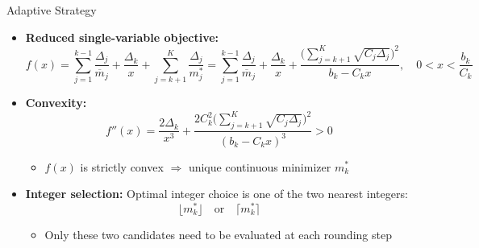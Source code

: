\documentclass{beamer}
\begin{document}
\begin{frame}{Adaptive Strategy}

{\fontsize{9}{9}\selectfont
\begin{itemize}[leftmargin=5pt]
\item \textcolor{myblue3}{\bf Reduced single-variable objective:}
\[
f(x)
= \sum_{j=1}^{k-1}\frac{\Delta_j}{\overline m_j}
+ \frac{\Delta_k}{x}
+ \sum_{j=k+1}^{K}\frac{\Delta_j}{m_j^*}
= \sum_{j=1}^{k-1}\frac{\Delta_j}{\overline m_j}
+ \frac{\Delta_k}{x}
+ \frac{\Big(\sum_{j=k+1}^{K} \sqrt{C_j \Delta_j}\Big)^2}{b_k - C_k x},
\quad 0 < x < \frac{b_k}{C_k}
\]

\item \textcolor{myblue3}{\bf Convexity:} 
\[
f''(x)
= \frac{2\Delta_k}{x^3} + \frac{2 C_k^2 \Big(\sum_{j=k+1}^K \sqrt{C_j \Delta_j}\Big)^2}{(b_k - C_k x)^3} > 0
\]
\begin{itemize}[leftmargin=15pt]
    \item \(f(x)\) is strictly convex \(\Rightarrow\) unique continuous minimizer \(m_k^*\)
\end{itemize}

\item \textcolor{myblue3}{\bf Integer selection:} Optimal integer choice is one of the two nearest integers:
\[
\lfloor m_k^* \rfloor \quad \text{or} \quad \lceil m_k^* \rceil
\]
\begin{itemize}[leftmargin=15pt]
    \item Only these two candidates need to be evaluated at each rounding step
\end{itemize}
\end{itemize}
}
\end{frame}


\end{document}
